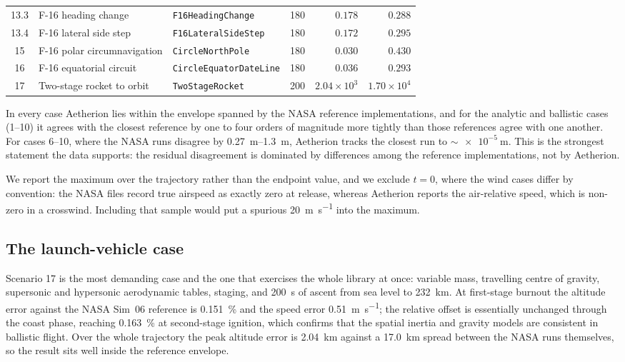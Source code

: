 \documentclass[a4paper,10pt]{article}
\newcommand{\code}[1]{\texttt{\small #1}}
\theoremstyle{definition}
\begin{document}
\begin{table}[h]
\begin{tabular}{cllcrr}
    13.3 & F-16 heading change        & \code{F16HeadingChange}          & 180 & $0.178$ & $0.288$ \\
    13.4 & F-16 lateral side step     & \code{F16LateralSideStep}        & 180 & $0.172$ & $0.295$ \\
    15 & F-16 polar circumnavigation  & \code{CircleNorthPole}           & 180 & $0.030$ & $0.430$ \\
    16 & F-16 equatorial circuit      & \code{CircleEquatorDateLine}     & 180 & $0.036$ & $0.293$ \\
    17 & Two-stage rocket to orbit    & \code{TwoStageRocket}            & 200 & $2.04\times10^{3}$ & $1.70\times10^{4}$ \\
    \bottomrule
  \end{tabular}
\end{table}

In every case Aetherion lies within the envelope spanned by the NASA reference
implementations, and for the analytic and ballistic cases (1--10) it agrees
with the closest reference by one to four orders of magnitude more tightly than
those references agree with one another.  For cases 6--10, where the NASA runs
disagree by \SIrange{0.27}{1.3}{\metre}, Aetherion tracks the closest run to
$\sim\!\SI{e-5}{\metre}$.  This is the strongest statement the data supports:
the residual disagreement is dominated by differences among the reference
implementations, not by Aetherion.

We report the maximum over the trajectory rather than the endpoint value,
and we exclude $t = 0$, where the wind cases differ by convention: the NASA
files record true airspeed as exactly zero at release, whereas Aetherion
reports the air-relative speed, which is non-zero in a crosswind.  Including
that sample would put a spurious \SI{20}{\metre\per\second} into the maximum.

\subsection{The launch-vehicle case}

Scenario 17 is the most demanding case and the one that exercises the whole
library at once: variable mass, travelling centre of gravity, supersonic and
hypersonic aerodynamic tables, staging, and \SI{200}{\second} of ascent from
sea level to \SI{232}{\kilo\metre}.  At first-stage burnout the altitude error
against the NASA Sim~06 reference is \SI{0.151}{\percent} and the speed error
\SI{0.51}{\metre\per\second}; the relative offset is essentially unchanged
through the coast phase, reaching \SI{0.163}{\percent} at second-stage
ignition, which confirms that the spatial inertia and gravity models are
consistent in ballistic flight.  Over the whole trajectory the peak altitude
error is \SI{2.04}{\kilo\metre} against a \SI{17.0}{\kilo\metre} spread between
the NASA runs themselves, so the result sits well inside the reference
envelope.
\end{document}
